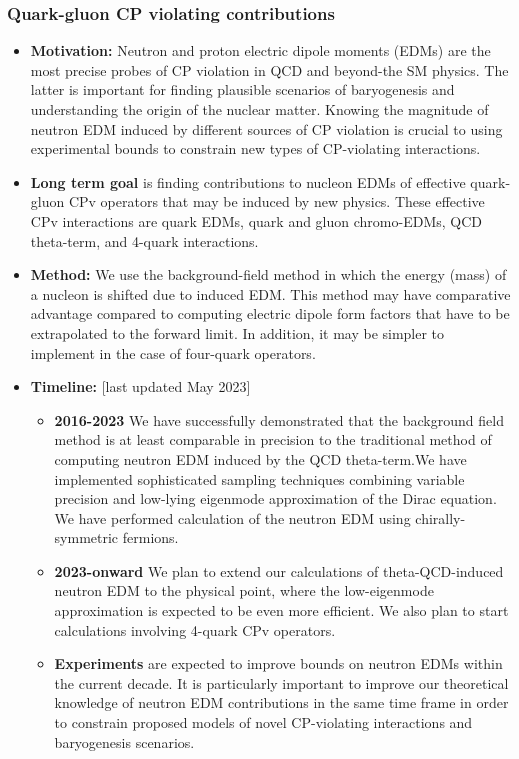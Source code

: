 \documentclass[12pt,hyperpdf]{article}
\begin{document}
\subsubsection{Quark-gluon CP violating contributions}
\begin{itemize}
    \item{\bf Motivation:} Neutron and proton electric dipole moments
      (EDMs) are the most precise probes of CP violation in QCD and
      beyond-the SM physics. The latter is important for finding
      plausible scenarios of baryogenesis and understanding the origin
      of the nuclear matter. Knowing the magnitude of neutron EDM
      induced by different sources of CP violation is crucial to using
      experimental bounds to constrain new types of CP-violating
      interactions. 
    \item{\bf Long term goal} is finding contributions to nucleon EDMs of
      effective quark-gluon CPv operators that may be induced by new
      physics. These effective CPv interactions are quark EDMs, quark
      and gluon chromo-EDMs, QCD theta-term, and 4-quark
      interactions. 
    \item{\bf Method:} We use the background-field method in which the
      energy (mass) of a nucleon is shifted due to induced EDM. This
      method may have comparative advantage compared to computing
      electric dipole form factors that have to be extrapolated to the
      forward limit. In addition, it may be simpler to implement in
      the case of four-quark operators. 
\item{\bf Timeline:} \hfill [last updated May 2023]
\begin{itemize}
    \item{\bf 2016-2023} We have successfully demonstrated that the
      background field method is at least comparable in precision to
      the traditional method of computing neutron EDM induced by the
      QCD theta-term.We have implemented sophisticated sampling
      techniques combining variable precision and low-lying eigenmode
      approximation of the Dirac equation. We have performed
      calculation of the neutron EDM using chirally-symmetric
      fermions. 
    \item{\bf 2023-onward} We plan to extend our calculations of
      theta-QCD-induced neutron EDM to the physical point, where the
      low-eigenmode approximation is expected to be even more
      efficient. We also plan to start calculations involving 4-quark
      CPv operators. 
    \item{\bf Experiments} are expected to improve bounds on neutron EDMs
      within the current decade. It is particularly important to
      improve our theoretical knowledge of neutron EDM contributions
      in the same time frame in order to constrain proposed models of
      novel CP-violating interactions and baryogenesis scenarios. 
\end{itemize}
\end{itemize}
\end{document}

